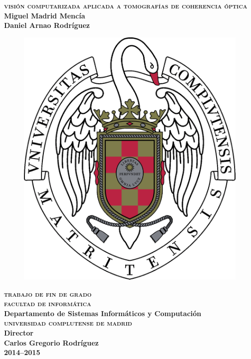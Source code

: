 
\begin{titlepage}
\begin{center}
  \textbf{\textsc{\Huge visión computarizada aplicada a tomografías de coherencia óptica}}\\[1cm]
  \textbf{\Large Miguel Madrid Mencía \\ Daniel Arnao Rodríguez}\\
  \vspace{0.5cm}
  \begin{figure}[H]
    \centering
    \includegraphics[scale=0.17]{imagenes/logos/logo-ucm.pdf}
  \end{figure}
  \vspace{0.5cm}
  \textbf{\textsc{\Large trabajo de fin de grado}}\\[1cm]
  \textbf{\textsc{\Large facultad de informática}}\\
  \textbf{\large Departamento de Sistemas Informáticos y Computación}\\[0.5cm]
  \textbf{\textsc{\Large universidad complutense de madrid}}\\[1.5cm]

  \textbf{Director}\\
  \textbf{\Large Carlos Gregorio Rodríguez}\\
  \vfill \textbf{\large 2014--2015}
\end{center}
\end{titlepage}
